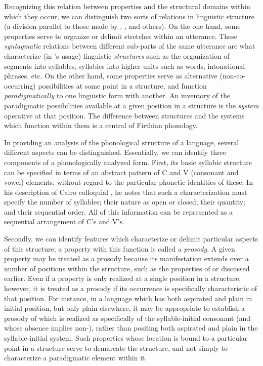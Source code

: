 Recognizing this relation between properties and the structural
domains with\-in which they occur, we can distinguish two sorts of
relations in linguistic structure (a division parallel to those made
by {\Saussure}, {\Hjelmslev}, and others). On the one hand, some properties
serve to organize or delimit stretches within an utterance. These
\emph{syntagmatic} relations between different sub-parts of the same
utterance are what characterize (in {\Firth}'s usage) linguistic
\emph{structures} such as the organization of segments into syllables,
syllables into higher units such as words, intonational phrases,
etc. On the other hand, some properties serve as alternative
(non-co-occurring) possibilities at some point in a structure, and
function \emph{paradigmatically} to  one linguistic form with
another. An inventory of the paradigmatic possibilities available at a
given position in a structure is the \emph{system} operative at that
position. The difference between structures and the systems which
function within them is a central  of Firthian phonology.

In providing an analysis of the phonological structure of a language,
several different aspects can be distinguished. Essentially, we can
identify three components of a phonologically analyzed form. First,
its basic syllabic structure can be specified in terms of an abstract
pattern of C and V (consonant and vowel) elements, without regard to
the particular phonetic identities of these. In his description of
Cairo colloquial  \citep{firth48:sounds:prosodies}, he notes
that such a characterization must specify the number of syllables;
their nature as open or closed; their quantity; and their sequential
order. All of this information can be represented as a sequential
arrangement of C's and V's.

Secondly, we can identify features which characterize or delimit
particular aspects of this structure; a property with this function is
called a \emph{prosody}. A given property may be treated as a prosody
because its manifestation extends over a number of positions within
the structure, such as the properties of  or
 discussed earlier. Even if a property is only
realized at a single position in a structure, however, it is treated
as a prosody if its occurrence is specifically characteristic of that
position. For instance, in a language which has both aspirated and
plain  in  initial position, but only plain
 elsewhere, it may be appropriate to establish a prosody of
 which is realized as  specifically of the
syllable-initial consonant (and whose absence implies non-),
rather than positing both aspirated and plain  in the
syllable-initial system. Such properties whose location is bound to a
particular point in a structure serve to demarcate the structure, and
not simply to characterize a paradigmatic element within it.

